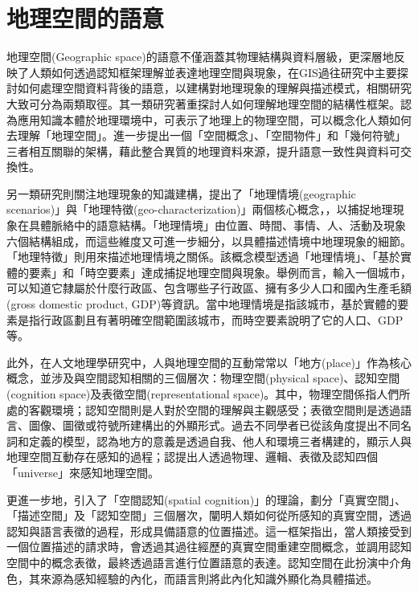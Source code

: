 \section{地理空間的語意}

地理空間(Geographic space)的語意不僅涵蓋其物理結構與資料層級，更深層地反映了人類如何透過認知框架理解並表達地理空間與現象，在GIS過往研究中主要探討如何處理空間資料背後的語意，以建構對地理現象的理解與描述模式，相關研究大致可分為兩類取徑。其一類研究著重探討人如何理解地理空間的結構性框架。\textcite{RN25}認為應用知識本體於地理環境中，可表示了地理上的物理空間，可以概念化人類如何去理解「地理空間」。\textcite{RN43}進一步提出一個「空間概念」、「空間物件」和「幾何符號」三者相互關聯的架構，藉此整合異質的地理資料來源，提升語意一致性與資料可交換性。

另一類研究則關注地理現象的知識建構，\textcite{RN161}提出了「地理情境(geographic scenarios)」與「地理特徵(geo-characterization)」兩個核心概念，，以捕捉地理現象在具體脈絡中的語意結構。「地理情境」由位置、時間、事情、人、活動及現象六個結構組成，而這些維度又可進一步細分，以具體描述情境中地理現象的細節。「地理特徵」則用來描述地理情境之關係。該概念模型透過「地理情境」、「基於實體的要素」和「時空要素」達成捕捉地理空間與現象。舉例而言，輸入一個城市，可以知道它隸屬於什麼行政區、包含哪些子行政區、擁有多少人口和國內生產毛額(gross domestic product, GDP)等資訊。當中地理情境是指該城市，基於實體的要素是指行政區劃且有著明確空間範圍該城市，而時空要素說明了它的人口、GDP等。

此外，在人文地理學研究中，人與地理空間的互動常常以「地方(place)」作為核心概念，並涉及與空間認知相關的三個層次：物理空間(physical space)、認知空間(cognition space)及表徵空間(representational space)。其中，物理空間係指人們所處的客觀環境；認知空間則是人對於空間的理解與主觀感受；表徵空間則是透過語言、圖像、圖徵或符號所建構出的外顯形式。過去不同學者已從該角度提出不同名詞和定義的模型，\textcite{RN131}認為地方的意義是透過自我、他人和環境三者構建的，顯示人與地理空間互動存在感知的過程；\textcite{RN57}認提出人透過物理、邏輯、表徵及認知四個「universe」來感知地理空間。

更進一步地，\textcite{RN128}引入了「空間認知(spatial cognition)」的理論，劃分「真實空間」、「描述空間」及「認知空間」三個層次，闡明人類如何從所感知的真實空間，透過認知與語言表徵的過程，形成具備語意的位置描述。這一框架指出，當人類接受到一個位置描述的請求時，會透過其過往經歷的真實空間重建空間概念，並調用認知空間中的概念表徵，最終透過語言進行位置語意的表達。認知空間在此扮演中介角色，其來源為感知經驗的內化，而語言則將此內化知識外顯化為具體描述。

